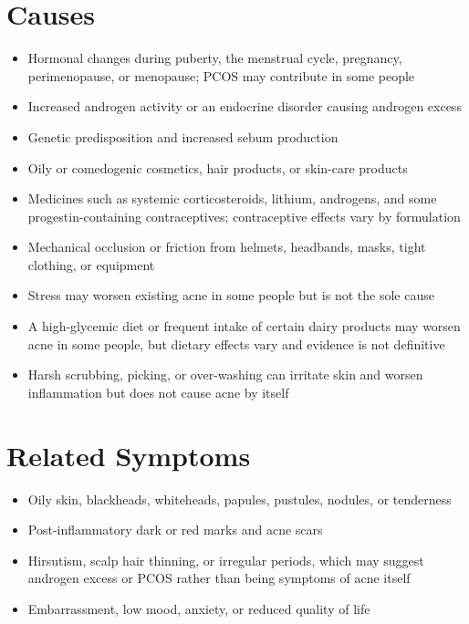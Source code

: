 \section*{Causes}
\begin{itemize}
 \item Hormonal changes during puberty, the menstrual cycle, pregnancy, perimenopause, or menopause; PCOS may contribute in some people
 \item Increased androgen activity or an endocrine disorder causing androgen excess
 \item Genetic predisposition and increased sebum production
 \item Oily or comedogenic cosmetics, hair products, or skin-care products
 \item Medicines such as systemic corticosteroids, lithium, androgens, and some progestin-containing contraceptives; contraceptive effects vary by formulation
 \item Mechanical occlusion or friction from helmets, headbands, masks, tight clothing, or equipment
 \item Stress may worsen existing acne in some people but is not the sole cause
 \item A high-glycemic diet or frequent intake of certain dairy products may worsen acne in some people, but dietary effects vary and evidence is not definitive
 \item Harsh scrubbing, picking, or over-washing can irritate skin and worsen inflammation but does not cause acne by itself
\end{itemize}

\section*{Related Symptoms}
\begin{itemize}
 \item Oily skin, blackheads, whiteheads, papules, pustules, nodules, or tenderness
 \item Post-inflammatory dark or red marks and acne scars
 \item Hirsutism, scalp hair thinning, or irregular periods, which may suggest androgen excess or PCOS rather than being symptoms of acne itself
 \item Embarrassment, low mood, anxiety, or reduced quality of life
\end{itemize}


